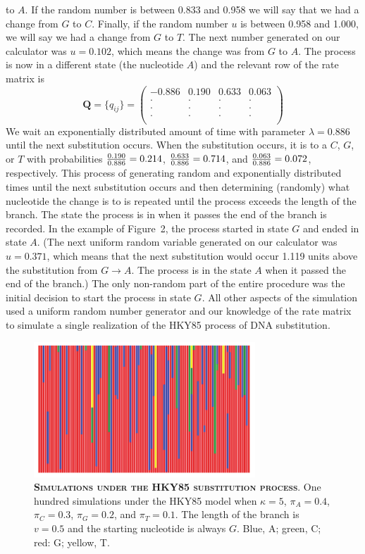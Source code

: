 \documentclass{svmult}
\begin{document}
to $A$. If the random number is between 0.833 and 0.958 we will say that we had a change from $G$
to $C$. Finally, if the random number $u$ is between 0.958 and 1.000, we will say we had a change
from $G$ to $T$. The next number generated on our calculator was $u = 0.102$, which means the
change was from $G$ to $A$. The process is now in a different state (the nucleotide $A$) and the
relevant row of the rate matrix is
$$
{\mathbf Q} = \{q_{ij}\} = \left( \begin{array}{cccc}
-0.886 &  0.190 &  0.633 &  0.063 \\
\cdot & \cdot &  \cdot &  \cdot \\
\cdot &  \cdot & \cdot &  \cdot \\
\cdot &  \cdot &  \cdot & \cdot \\
\end{array} \right)
$$
We wait an exponentially distributed amount of time with parameter $\lambda = 0.886$ until the next
substitution occurs. When the substitution occurs, it is to a $C$, $G$, or $T$ with probabilities
${0.190 \over 0.886} = 0.214$, ${0.633 \over 0.886} = 0.714$, and ${0.063 \over 0.886} = 0.072$,
respectively. This process of generating random and exponentially distributed times until the next
substitution occurs and then determining (randomly) what nucleotide the change is to is repeated
until the process exceeds the length of the branch. The state the process is in when it passes the
end of the branch is recorded. In the example of Figure~2, the process started in state $G$ and
ended in state $A$. (The next uniform random variable generated on our calculator was $u = 0.371$,
which means that the next substitution would occur 1.119 units above the substitution from $G
\rightarrow A$. The process is in the state $A$ when it passed the end of the branch.) The only
non-random part of the entire procedure was the initial decision to start the process in state $G$.
All other aspects of the simulation used a uniform random number generator and our knowledge of the
rate matrix to simulate a single realization of the HKY85 process of DNA substitution. 

\begin{figure}[t]
\centering
\includegraphics[height=2in]{fig3}
\caption{\textbf{\textsc{Simulations under the HKY85 substitution process}}.
One hundred simulations under the HKY85 model when 
$\kappa = 5$, $\pi_A = 0.4$, $\pi_C = 0.3$, $\pi_G = 0.2$, and $\pi_T = 0.1$. The length of the branch
is $v = 0.5$ and the starting nucleotide is always $G$. Blue, A; green, C; red: G; yellow, T. 
}
\label{fig3}
\end{figure}
\end{document}
